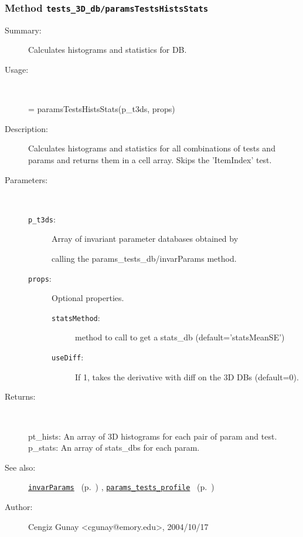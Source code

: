 \subsubsection[Method \texttt{paramsTestsHistsStats}]{Method \texttt{tests\_3D\_db/paramsTestsHistsStats}}%
%
\label{ref_tests_3D_db__paramsTestsHistsStats}%
\hypertarget{ref_tests_3D_db__paramsTestsHistsStats}{}%
\begin{description}
\item[Summary:]Calculates histograms and statistics for DB.
%
\item[Usage:]~%
\begin{lyxcode}%
[pt\_hists, p\_stats] = paramsTestsHistsStats(p\_t3ds, props)
%
\end{lyxcode}%
%
\item[Description:]%
Calculates histograms and statistics for all combinations of tests 
 and params and returns them in a cell array. Skips the 'ItemIndex' test.
\item[Parameters:]~
\begin{description}%
\item[\texttt{p\_t3ds}:]
 Array of invariant parameter databases obtained by

calling the params\_tests\_db/invarParams method.
\item[\texttt{props}:]
 Optional properties.
\begin{description}%
\item[\texttt{statsMethod}:]
 method to call to get a stats\_db (default='statsMeanSE')
\item[\texttt{useDiff}:]
 If 1, takes the derivative with diff on the 3D DBs (default=0).
\end{description}%
\end{description}%
%
\item[Returns:
]~

	pt\_hists: An array of 3D histograms for each pair of param 
		  and test.
	p\_stats: An array of stats\_dbs for each param.
%
%
\item[See also:]%
\hyperlink{ref_invarParams}{\texttt{invarParams}}%
\ (p.~\pageref{ref_invarParams})%
%
, \hyperlink{ref_params_tests_profile}{\texttt{params\_tests\_profile}}%
\ (p.~\pageref{ref_params_tests_profile})%
%
%
\item[Author:]%
Cengiz Gunay <cgunay@emory.edu>, 2004/10/17
%
\end{description}
\methodline%
